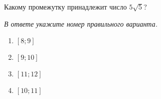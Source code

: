 Какому промежутку принадлежит число \(5\sqrt{5}\)?

\textit{В ответе укажите номер правильного варианта.}
\begin{multicols}{4}
	\begin{enumerate}[label=\arabic*)]
		\item $[8;9]$
		\item $[9;10]$
		\item $[11;12]$
		\item $[10;11]$
	\end{enumerate}
\end{multicols}